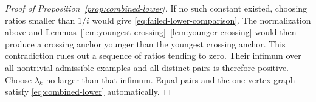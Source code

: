 \begin{proof}[Proof of Proposition~\ref{prop:combined-lower}]
If no such constant existed, choosing ratios smaller than $1/i$ would
give \eqref{eq:failed-lower-comparison}.  The normalization above and
Lemmas~\ref{lem:youngest-crossing}--\ref{lem:younger-crossing} would then
produce a crossing anchor younger than the youngest crossing anchor.
This contradiction rules out a sequence of ratios tending to zero.
Their infimum over all nontrivial admissible examples and all distinct
pairs is therefore positive.  Choose $\lambda_k$ no larger than that
infimum.  Equal pairs and the one-vertex graph satisfy
\eqref{eq:combined-lower} automatically.
\end{proof}
